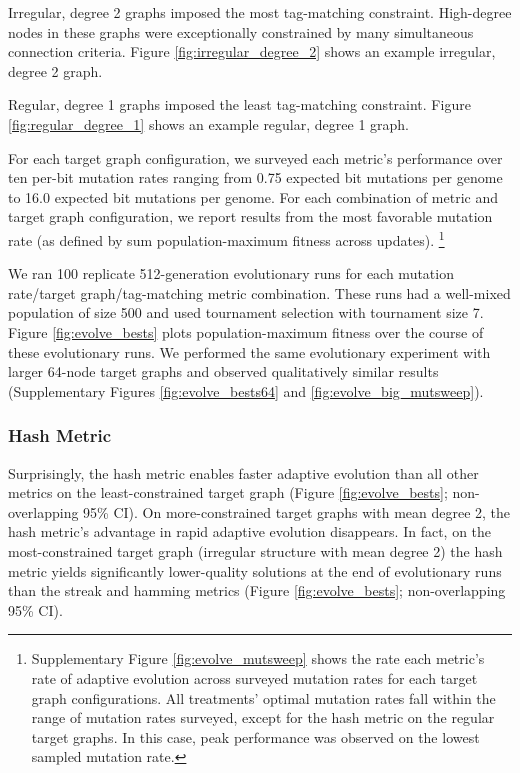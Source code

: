 Irregular, degree 2 graphs imposed the most tag-matching constraint.
High-degree nodes in these graphs were exceptionally constrained by many simultaneous connection criteria.
Figure \ref{fig:irregular_degree_2} shows an example irregular, degree 2 graph.

Regular, degree 1 graphs imposed the least tag-matching constraint.
Figure \ref{fig:regular_degree_1} shows an example regular, degree 1 graph.

For each target graph configuration, we surveyed each metric's performance over ten per-bit mutation rates ranging from 0.75 expected bit mutations per genome to 16.0 expected bit mutations per genome.
For each combination of metric and target graph configuration, we report results from the most favorable mutation rate (as defined by sum population-maximum fitness across updates).
\footnote{
Supplementary Figure \ref{fig:evolve_mutsweep} shows the rate each metric's rate of adaptive evolution across surveyed mutation rates for each target graph configurations.
All treatments' optimal mutation rates fall within the range of mutation rates surveyed, except for the hash metric on the regular target graphs.
In this case, peak performance was observed on the lowest sampled mutation rate.
}

We ran 100 replicate 512-generation evolutionary runs for each mutation rate/target graph/tag-matching metric combination.
These runs had a well-mixed population of size 500 and used tournament selection with tournament size 7.
Figure \ref{fig:evolve_bests} plots population-maximum fitness over the course of these evolutionary runs.
We performed the same evolutionary experiment with larger 64-node target graphs and observed qualitatively similar results (Supplementary Figures \ref{fig:evolve_bests64} and \ref{fig:evolve_big_mutsweep}).

\subsubsection{Hash Metric}

Surprisingly, the hash metric enables faster adaptive evolution than all other metrics on the least-constrained target graph (Figure \ref{fig:evolve_bests}; non-overlapping 95\% CI).
On more-constrained target graphs with mean degree 2, the hash metric's advantage in rapid adaptive evolution disappears.
In fact, on the most-constrained target graph (irregular structure with mean degree 2) the hash metric yields significantly lower-quality solutions at the end of evolutionary runs than the streak and hamming metrics (Figure \ref{fig:evolve_bests}; non-overlapping 95\% CI).

